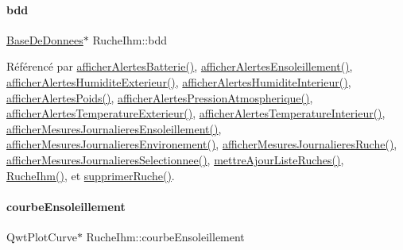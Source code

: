 \paragraph{\texorpdfstring{bdd}{bdd}}
{\footnotesize\ttfamily \hyperlink{class_base_de_donnees}{Base\+De\+Donnees}$\ast$ Ruche\+Ihm\+::bdd\hspace{0.3cm}{\ttfamily [private]}}



Référencé par \hyperlink{class_ruche_ihm_a5181062e21dc73908b660d97e9621fb6}{afficher\+Alertes\+Batterie()}, \hyperlink{class_ruche_ihm_aea5efc506f9825db2a4eb39a40d7eb18}{afficher\+Alertes\+Ensoleillement()}, \hyperlink{class_ruche_ihm_a76b73e39e55443fc7b9bb773eac3321f}{afficher\+Alertes\+Humidite\+Exterieur()}, \hyperlink{class_ruche_ihm_abfe91b271dde97048bb218b04c9e167b}{afficher\+Alertes\+Humidite\+Interieur()}, \hyperlink{class_ruche_ihm_a641d05346e527c3386ed9df6a7e6fafc}{afficher\+Alertes\+Poids()}, \hyperlink{class_ruche_ihm_abea08b19d4f52f6767a8618bbc25d956}{afficher\+Alertes\+Pression\+Atmospherique()}, \hyperlink{class_ruche_ihm_ada4be5a54f7fa57de6190d44e3cfcb82}{afficher\+Alertes\+Temperature\+Exterieur()}, \hyperlink{class_ruche_ihm_af4848134f2bc17d9772f2408a068e9d8}{afficher\+Alertes\+Temperature\+Interieur()}, \hyperlink{class_ruche_ihm_abc250d15e6782c522b3d6676e0ee032d}{afficher\+Mesures\+Journalieres\+Ensoleillement()}, \hyperlink{class_ruche_ihm_a5ee5942435915ca134765f42ff4b9061}{afficher\+Mesures\+Journalieres\+Environement()}, \hyperlink{class_ruche_ihm_a94bd98327a73a15aad1306fc31f53ce8}{afficher\+Mesures\+Journalieres\+Ruche()}, \hyperlink{class_ruche_ihm_a7f66af552d9e7ba0d00437ff3b330706}{afficher\+Mesures\+Journalieres\+Selectionnee()}, \hyperlink{class_ruche_ihm_a77cb005fde7e2271e8721c23cef13b3e}{mettre\+Ajour\+Liste\+Ruches()}, \hyperlink{class_ruche_ihm_a04c2544ba4e9cca6c38f553c32d63dee}{Ruche\+Ihm()}, et \hyperlink{class_ruche_ihm_a85729b1ae4f3dfb5130eb45f5a426e3c}{supprimer\+Ruche()}.

\mbox{\label{class_ruche_ihm_af160181f408b3a9519b97e67c810a0fd}} 
\paragraph{\texorpdfstring{courbe\+Ensoleillement}{courbeEnsoleillement}}
{\footnotesize\ttfamily Qwt\+Plot\+Curve$\ast$ Ruche\+Ihm\+::courbe\+Ensoleillement\hspace{0.3cm}{\ttfamily [private]}}



